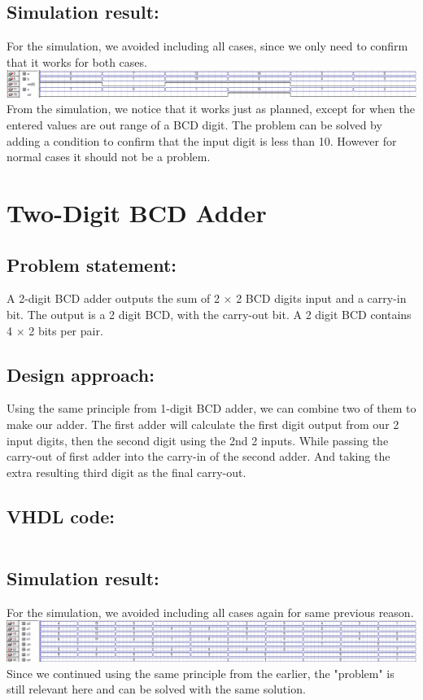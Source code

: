 \documentclass[a4paper, 12pt, english]{article}
\begin{document}
\subsection{Simulation result:}
For the simulation, we avoided including all cases, since we only need to confirm that it works for both cases.\\
\includegraphics[width=\textwidth]{lab 1/ex1.png}
From the simulation, we notice that it works just as planned, except for when the entered values are out range of a BCD digit. The problem can be solved by adding a condition to confirm that the input digit is less than 10. However for normal cases it should not be a problem.

\newpage
\section{Two-Digit BCD Adder}
\subsection{Problem statement:}
A 2-digit BCD adder outputs the sum of 2 $\times$ 2 BCD digits input and a carry-in bit. The output is a 2 digit BCD, with the carry-out bit. A 2 digit BCD contains 4 $\times$ 2 bits per pair. 
\subsection{Design approach:}
Using the same principle from 1-digit BCD adder, we can combine two of them to make our adder. The first adder will calculate the first digit output from our 2 input digits, then the second digit using the 2nd 2 inputs. While passing the carry-out of first adder into the carry-in of the second adder. And taking the extra resulting third digit as the final carry-out. 

\subsection{VHDL code:}
\inputminted[linenos,bgcolor=gray!20]{Vhdl}{part2.vhd}

\subsection{Simulation result:}
For the simulation, we avoided including all cases again for same previous reason.\\
\includegraphics[width=\textwidth]{lab 1/ex2.png}
Since we continued using the same principle from the earlier, the "problem" is still relevant here and can be solved with the same solution.
\end{document}

